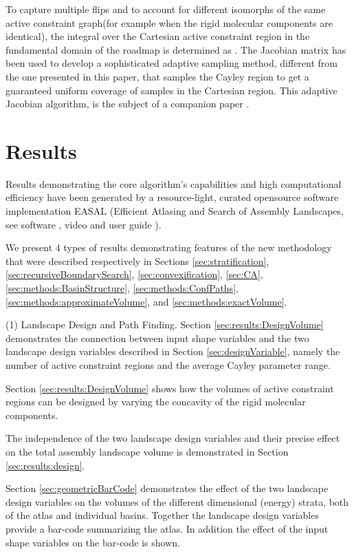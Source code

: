 \documentclass[]{article}
\newcommand{\acgW}{active constraint graph}
\newcommand{\rmc}{rigid molecular component}
\begin{document}
To capture multiple flips and to account for  different
isomorphs of the same \acgW (for example when the \rmc s are identical), 
the integral over the Cartesian active constraint region in
the fundamental domain of the roadmap is 
determined as . 
The Jacobian
matrix has been used to develop a sophisticated adaptive sampling method,
different from the one presented in this paper, that samples the Cayley region
to get a guaranteed uniform coverage of samples in the Cartesian region. This 
adaptive Jacobian algorithm, is the subject of a companion paper \cite{Ozkan2014Jacobian}.
 \section{Results}
\label{sec:results}

Results demonstrating the core algorithm's capabilities and high computational
efficiency have been generated by a resource-light, curated opensource software
implementation EASAL \cite{Ozkan:toms} (Efficient Atlasing and Search of
Assembly Landscapes, see software \cite{easalSoftware}, video \cite{easalVideo}
and user guide \cite{easalUserGuide}). 

We present 4 types of results demonstrating features of the new methodology
that were described respectively in Sections \ref{sec:stratification},
\ref{sec:recursiveBoundarySearch}, \ref{sec:convexification}, \ref{sec:CA},
\ref{sec:methods:BasinStructure}, \ref{sec:methods:ConfPaths},
\ref{sec:methods:approximateVolume}, and \ref{sec:methods:exactVolume}.

(1) Landscape Design and Path Finding. Section \ref{sec:results:DesignVolume}
demonstrates the connection between input shape variables and the two landscape
design variables described in Section \ref{sec:designVariable}, namely the
number of active constraint regions and the average Cayley parameter range. 

Section \ref{sec:results:DesignVolume} shows how the volumes of active
constraint regions can be designed by varying the concavity of the \rmc s. 

The independence of the two landscape design variables and their precise effect
on the total assembly landscape volume is demonstrated in Section
\ref{sec:results:design}. 

Section
\ref{sec:geometricBarCode} demonstrates the effect of the two landscape design
variables on the volumes of the different dimensional (energy) strata, both of
the atlas and individual basins. Together the landscape design variables
provide a bar-code summarizing the atlas. In addition the effect of the input
shape variables on the bar-code is shown. 
\end{document}
